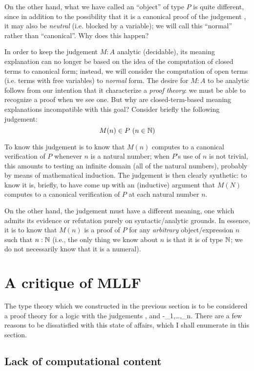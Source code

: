 \documentclass[main.tex]{subfiles}
\begin{document}
On the other hand, what we have called an ``object'' of type $P$ is quite
different, since in addition to the possibility that it is a canonical proof of
the judgement , it may also be \emph{neutral} (i.e. blocked by a
variable); we will call this ``normal'' rather than ``canonical''. Why does
this happen?

In order to keep the judgement $M:A$ analytic (decidable), its meaning
explanation can no longer be based on the idea of the computation of closed
terms to canonical form; instead, we will consider the computation of open
terms (i.e. terms with free variables) to \emph{normal} form. The desire for
$M:A$ to be analytic follows from our intention that it characterize a
\emph{proof theory}: we must be able to recognize a proof when we see one. But
why are closed-term-based meaning explanations incompatible with this goal?
Consider briefly the following judgement:
\[
  M(n) \in P\ (n\in\mathbb{N})
\]

To know this judgement is to know that $M(n)$ computes to a canonical
verification of $P$ whenever $n$ is a natural number; when $P$'s use of $n$ is
not trivial, this amounts to testing an infinite domain (all of the natural
numbers), probably by means of mathematical induction. The judgement is then
clearly synthetic: to know it is, briefly, to have come up with an (inductive)
argument that $M(N)$ computes to a canonical verification of $P$ at each
natural number $n$.

On the other hand, the judgement  must have a
different meaning, one which admits its evidence or refutation purely on
syntactic/analytic grounds. In essence, it is to know that $M(n)$ is a proof of
$P$ for any \emph{arbitrary} object/expression $n$ such that $n:\mathbb{N}$
(i.e., the only thing we know about $n$ is that it is of type $\mathbb{N}$; we
do not necessarily know that it is a numeral).


\section{A critique of \textbf{MLLF}}

The type theory which we constructed in the previous section is to be
considered a proof theory for a logic with the judgements ,
 and \hyp{}{_1,\dots,_n}. There are
a few reasons to be dissatisfied with this state of affairs, which I shall
enumerate in this section.

\subsection{Lack of computational content}
\end{document}
